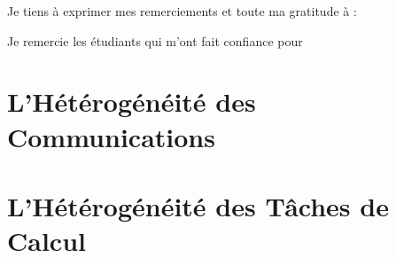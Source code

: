 \documentclass[final,twoside]{hdr} %
\begin{document}
\begin{thanks}
{Je tiens à exprimer mes remerciements et toute ma gratitude à :}

%
%
%
%
%
\item Je remercie les étudiants qui m'ont fait confiance pour
%
\end{thanks}

\tableofcontents




\chapter{L'Hétérogénéité des Communications}



\chapter{L'Hétérogénéité des Tâches de Calcul}
\end{document}
